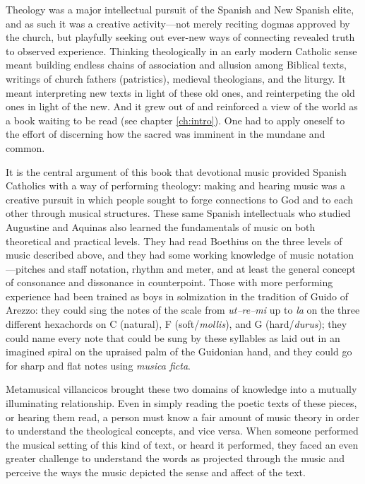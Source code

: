 Theology was a major intellectual pursuit of the Spanish and New Spanish elite,
and as such it was a creative activity---not merely reciting dogmas
approved by the church, but playfully seeking out ever-new ways of connecting
revealed truth to observed experience.
Thinking theologically in an early modern Catholic sense meant building 
endless chains of association and allusion among Biblical texts, writings of
church fathers (patristics), medieval theologians, and the liturgy. 
It meant interpreting new texts in light of these old ones, and reinterpeting
the old ones in light of the new.
And it grew out of and reinforced a view of the world as a book waiting to be
read (see chapter \ref{ch:intro}).
One had to apply oneself to the effort of discerning how the sacred was
imminent in the mundane and common.%
    \Autocite{Chavez:DistortingReality}

It is the central argument of this book that devotional music provided Spanish
Catholics with a way of performing theology: making and hearing music was a
creative pursuit in which people sought to forge connections to God and to each
other through musical structures.
These same Spanish intellectuals who studied Augustine and Aquinas also learned
the fundamentals of music on both theoretical and practical levels.
They had read Boethius on the three levels of music described above, and they
had some working knowledge of music notation---pitches and staff notation,
rhythm and meter, and at least the general concept of consonance and dissonance
in counterpoint.
Those with more performing experience had been trained as boys in solmization in
the tradition of Guido of Arezzo: they could sing the notes of the scale from
\emph{ut--re--mi} up to \emph{la} on the three different hexachords on C
(natural), F (soft/\emph{mollis}), and G (hard/\emph{durus}); they could name
every note that could be sung by these syllables as laid out in an imagined
spiral on the upraised palm of the Guidonian hand, and they could go
 for sharp and flat notes using \emph{musica ficta}.%
    \Autocite{Cohen:NotesMiddleAges}

Metamusical villancicos brought these two domains of knowledge into a mutually
illuminating relationship.
Even in simply reading the poetic texts of these pieces, or hearing them read,
a person must know a fair amount of music theory in order to understand the
theological concepts, and vice versa.
When someone performed the musical setting of this kind of text, or heard it
performed, they faced an even greater challenge to understand the words as
projected through the music and perceive the ways the music depicted the sense
and affect of the text. 

